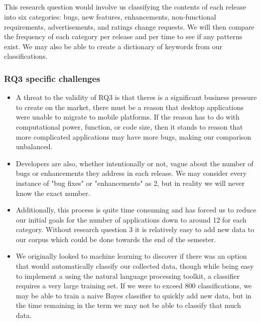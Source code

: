 \documentclass{acm_proc_article-sp}
\begin{document}
\subsection{\RQThree }
This research question would involve us classifying the contents of each release into six categories: bugs, new features, enhancements, non-functional requirements, advertisements, and ratings change requests.
We will then compare the frequency of each category per release and per time to see if any patterns exist.
We may also be able to create a dictionary of keywords from our classifications.

\subsubsection{RQ3 specific challenges}
\begin{itemize}


\item A threat to the validity of RQ3 is that theres is a significant business pressure to create \sibs on the market, there must be a reason that desktop applications were unable to migrate to mobile platforms. 
If the reason has to do with computational power, function, or code size, then it stands to reason that more complicated applications may have more bugs, making our comparison unbalanced.

\item Developers are also, whether intentionally or not, vague about the number of bugs or enhancements they address in each release. 
We may consider every instance of "bug fixes" or "enhancements" as 2, but in reality we will never know the exact number.

\item Additionally, this process is quite time consuming and has forced us to reduce our initial goals for the number of applications down to around 12 for each category.
Without research question 3 it is relatively easy to add new data to our corpus which could be done towards the end of the semester.

\item We originally looked to machine learning to discover if there was an option that would automatically classify our collected data, though while being easy to implement a using the natural language processing toolkit, a classifier requires a very large training set.
If we were to exceed 800 classifications, we may be able to train a naive Bayes classifier to quickly add new data, but in the time remaining in the term we may not be able to classify that much data.

\end{itemize}
\end{document}

